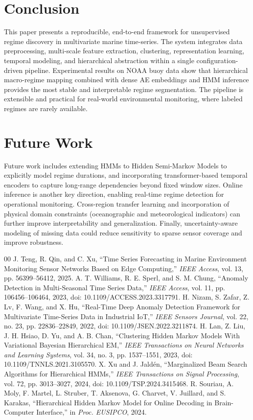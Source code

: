 \documentclass[conference]{IEEEtran}
\begin{document}
\section{Conclusion}
This paper presents a reproducible, end-to-end framework for unsupervised regime discovery in multivariate marine time-series. The system integrates data preprocessing, multi-scale feature extraction, clustering, representation learning, temporal modeling, and hierarchical abstraction within a single configuration-driven pipeline. Experimental results on NOAA buoy data show that hierarchical macro-regime mapping combined with dense AE embeddings and HMM inference provides the most stable and interpretable regime segmentation. The pipeline is extensible and practical for real-world environmental monitoring, where labeled regimes are rarely available.

\section{Future Work}
Future work includes extending HMMs to Hidden Semi-Markov Models to explicitly model regime durations, and incorporating transformer-based temporal encoders to capture long-range dependencies beyond fixed window sizes. Online inference is another key direction, enabling real-time regime detection for operational monitoring. Cross-region transfer learning and incorporation of physical domain constraints (oceanographic and meteorological indicators) can further improve interpretability and generalization. Finally, uncertainty-aware modeling of missing data could reduce sensitivity to sparse sensor coverage and improve robustness.

\begin{thebibliography}{00}
 J. Teng, R. Qin, and C. Xu, ``Time Series Forecasting in Marine Environment Monitoring Sensor Networks Based on Edge Computing,'' \textit{IEEE Access}, vol. 13, pp. 56399--56412, 2025.
 A. T. Williams, R. E. Sperl, and S. M. Chung, ``Anomaly Detection in Multi-Seasonal Time Series Data,'' \textit{IEEE Access}, vol. 11, pp. 106456--106464, 2023, doi: 10.1109/ACCESS.2023.3317791.
 H. Nizam, S. Zafar, Z. Lv, F. Wang, and X. Hu, ``Real-Time Deep Anomaly Detection Framework for Multivariate Time-Series Data in Industrial IoT,'' \textit{IEEE Sensors Journal}, vol. 22, no. 23, pp. 22836--22849, 2022, doi: 10.1109/JSEN.2022.3211874.
 H. Lan, Z. Liu, J. H. Hsiao, D. Yu, and A. B. Chan, ``Clustering Hidden Markov Models With Variational Bayesian Hierarchical EM,'' \textit{IEEE Transactions on Neural Networks and Learning Systems}, vol. 34, no. 3, pp. 1537--1551, 2023, doi: 10.1109/TNNLS.2021.3105570.
 X. Xu and J. Jald{\'e}n, ``Marginalized Beam Search Algorithms for Hierarchical HMMs,'' \textit{IEEE Transactions on Signal Processing}, vol. 72, pp. 3013--3027, 2024, doi: 10.1109/TSP.2024.3415468.
 R. Souriau, A. Moly, F. Martel, L. Struber, T. Aksenova, G. Charvet, V. Juillard, and S. Karakas, ``Hierarchical Hidden Markov Model for Online Decoding in Brain-Computer Interface,'' in \textit{Proc. EUSIPCO}, 2024.
\end{thebibliography}
\vspace{12pt}
\end{document}
